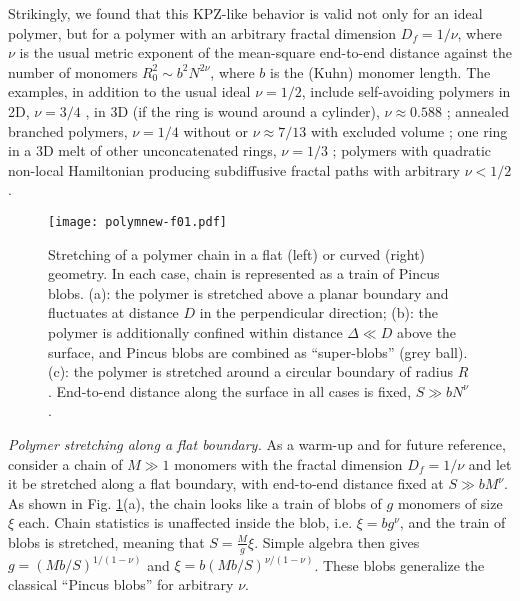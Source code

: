 \documentclass[aps,pre,floatfix,twocolumn,nofootinbib]{revtex4-2}
\begin{document}
Strikingly, we found that this KPZ-like behavior is valid not only for an ideal polymer, but for a polymer with an arbitrary fractal dimension $D_f=1/\nu$, where $\nu$ is the usual metric exponent of the mean-square end-to-end distance against the number of monomers $R_0^2 \sim b^2 N^{2\nu}$, where $b$ is the (Kuhn) monomer length. The examples, in addition to the usual ideal $\nu = 1/2$, include self-avoiding polymers in 2D, $\nu = 3/4$ \cite{nienhuis}, in 3D (if the ring is wound around a cylinder), $\nu \approx 0.588$ \cite{li}; annealed branched polymers, $\nu = 1/4$ \cite{zimm} without or $\nu \approx 7/13$ with excluded volume \cite{BranchedUnivClass}; one ring in a 3D melt of other unconcatenated rings, $\nu = 1/3$ \cite{khokhlov-nech,halverson}; polymers with quadratic non-local Hamiltonian producing subdiffusive fractal paths with arbitrary $\nu < 1/2$ \cite{nech-tamm-pol,polovnikov19}.


\begin{figure}
  \centering
  \texttt{[image: polymnew-f01.pdf]}
  \caption{Stretching of a polymer chain in a flat (left) or curved (right) geometry.  In each case, chain is represented as a train of Pincus blobs.  (a): the polymer is stretched above a planar boundary and fluctuates at distance $D$ in the perpendicular direction; (b): the polymer is additionally confined within distance $\Delta \ll D$ above the surface, and Pincus blobs are combined as ``super-blobs'' (grey ball). (c): the polymer is stretched around a circular boundary of radius $R$. End-to-end distance along the surface in all cases is fixed, $S \gg b N^{\nu}$.}
\label{fig:pol-f01}
\end{figure}



\textit{Polymer stretching along a flat boundary.}  As a warm-up and for future reference, consider a chain of $M \gg 1$ monomers with the fractal dimension $D_f=1/\nu$ and let it be stretched along a flat boundary, with end-to-end distance fixed at $S \gg b M^{\nu}$. As shown in Fig. \ref{fig:pol-f01}(a), the chain looks like a train of blobs of $g$ monomers of size $\xi$ each. Chain statistics is unaffected inside the blob, i.e. $\xi = b g^{\nu}$, and the train of blobs is stretched, meaning that $S = \frac{M}{g} \xi$. Simple algebra then gives  $g = \left( M b/S \right)^{1/(1-\nu)}$ and $\xi = b \left( M b/S \right)^{\nu/(1-\nu)}$. These blobs generalize the classical ``Pincus blobs'' \cite{PincusBlobs_ma60051a002} for arbitrary $\nu$.
\end{document}
